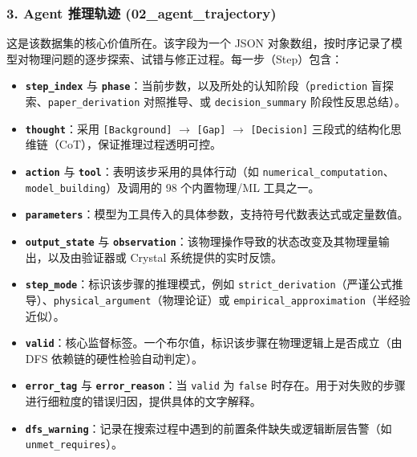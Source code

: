 \documentclass[12pt,a4paper]{article}
\begin{document}
\subsubsection{3. Agent 推理轨迹 (02\_agent\_trajectory)}
这是该数据集的核心价值所在。该字段为一个 JSON 对象数组，按时序记录了模型对物理问题的逐步探索、试错与修正过程。每一步（Step）包含：
\begin{itemize}
\item \textbf{\texttt{step\_index}} 与 \textbf{\texttt{phase}}：当前步数，以及所处的认知阶段（\texttt{prediction} 盲探索、\texttt{paper\_derivation} 对照推导、或 \texttt{decision\_summary} 阶段性反思总结）。
\item \textbf{\texttt{thought}}：采用 \texttt{[Background]} $\rightarrow$ \texttt{[Gap]} $\rightarrow$ \texttt{[Decision]} 三段式的结构化思维链（CoT），保证推理过程透明可控。
\item \textbf{\texttt{action}} 与 \textbf{\texttt{tool}}：表明该步采用的具体行动（如 \texttt{numerical\_computation}、\texttt{model\_building}）及调用的 98 个内置物理/ML 工具之一。
\item \textbf{\texttt{parameters}}：模型为工具传入的具体参数，支持符号代数表达式或定量数值。
\item \textbf{\texttt{output\_state}} 与 \textbf{\texttt{observation}}：该物理操作导致的状态改变及其物理量输出，以及由验证器或 Crystal 系统提供的实时反馈。
\item \textbf{\texttt{step\_mode}}：标识该步骤的推理模式，例如 \texttt{strict\_derivation}（严谨公式推导）、\texttt{physical\_argument}（物理论证）或 \texttt{empirical\_approximation}（半经验近似）。
\item \textbf{\texttt{valid}}：核心监督标签。一个布尔值，标识该步骤在物理逻辑上是否成立（由 DFS 依赖链的硬性检验自动判定）。
\item \textbf{\texttt{error\_tag}} 与 \textbf{\texttt{error\_reason}}：当 \texttt{valid} 为 \texttt{false} 时存在。用于对失败的步骤进行细粒度的错误归因，提供具体的文字解释。
\item \textbf{\texttt{dfs\_warning}}：记录在搜索过程中遇到的前置条件缺失或逻辑断层告警（如 \texttt{unmet\_requires}）。
\end{itemize}
\end{document}
